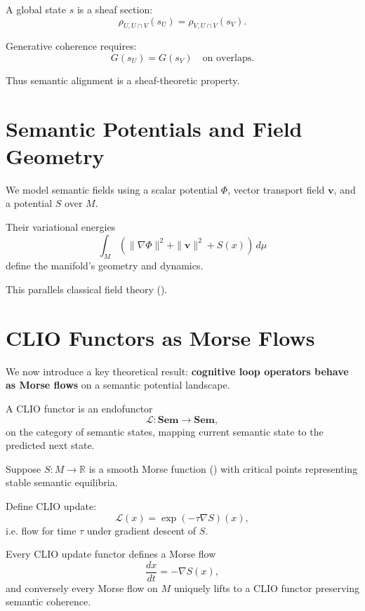 \documentclass[11pt,a4paper,twocolumn]{article}
\begin{document}
A global state $s$ is a sheaf section:
\[
\rho_{U,U\cap V}(s_U)
=
\rho_{V,U\cap V}(s_V).
\]

Generative coherence requires:
\[
G(s_U) = G(s_V)
\quad\text{on overlaps}.
\]

Thus semantic alignment is a sheaf-theoretic property.

\section{Semantic Potentials and Field Geometry}

We model semantic fields using 
a scalar potential $\Phi$, vector transport field $\mathbf{v}$,
and a potential $S$ over $M$.

Their variational energies 
\[
\int_M 
\left(
\|\nabla \Phi\|^2 
+ \|\mathbf{v}\|^2 
+ S(x)
\right)\, d\mu
\]
define the manifold's geometry and dynamics.

This parallels classical field theory 
(\cite{arnold1989mathematical}).

\section{CLIO Functors as Morse Flows}

We now introduce a key theoretical result:
\textbf{cognitive loop operators behave as Morse flows}
on a semantic potential landscape.

\begin{definition}
A CLIO functor is an endofunctor
\[
\mathcal{L} : \mathbf{Sem} \to \mathbf{Sem},
\]
on the category of semantic states, 
mapping current semantic state to the predicted next state.
\end{definition}

Suppose $S : M \to \mathbb{R}$ is a smooth Morse function
(\cite{milnor1963morse})
with critical points representing stable semantic equilibria.

Define CLIO update:
\[
\mathcal{L}(x) 
= 
\exp(-\tau \nabla S)(x),
\]
i.e. flow for time $\tau$ under gradient descent of $S$.

\begin{theorem}
Every CLIO update functor defines a Morse flow
\[
\frac{dx}{dt} = -\nabla S(x),
\]
and conversely every Morse flow on $M$ uniquely lifts to a CLIO functor
preserving semantic coherence.
\end{theorem}
\end{document}
